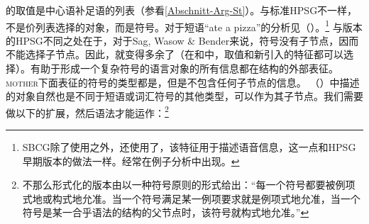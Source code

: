 \noindent
\comps{}的取值是中心语补足语的列表（参看\ref{Abschnitt-Arg-St}）。与标准HPSG\indexhpsgc 不一样，不是价列表选择的对象，而是符号。对于短语“ate a pizza”的分析见（）。\footnote{%
  SBCG除了使用\phonfc 之外，还使用了\formfc，该特征用于描述语音信息，这一点和HPSG早期版本的做法一样\citep[\S~3.1, \S~3.6]{Sag2012a}。\formfc 经常在例子分析中出现。
}
\ea
\label{feat-geom-swb}
\z
与\citet{ps2}版本的HPSG不同之处在于，对于Sag, Wasow \& Bender来说，符号没有子节点，因而不能选择子节点。因此，\synsemfc {}就变得多余了（在和中，\phonvc 取值和新引入的\formfc 特征都可以选择）。有助于形成一个复杂符号的语言对象的所有信息都在结构的外部表征。\textsc{mother}下面表征的符号的类型都是，但是不包含任何子节点的信息。 （）中描述的对象自然也是不同于短语或词汇符号的其他类型，可以作为其子节点。我们需要做以下的扩展，然后语法才能运作\citep*[]{SWB2003a}：\footnote{%
不那么形式化的版本由\citet[]{Sag2012a}以一种符号原则的形式给出：“每一个符号都要被例项式地或构式地允准。当一个符号满足某一例项要求就是例项式地允准，当一个符号是某一合乎语法的结构的父节点时，该符号就构式地允准。” 
}
